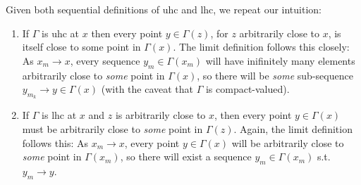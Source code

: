 \documentclass{article}
\theoremstyle{mythm}
\theoremstyle{mydef}
\begin{document}
Given both sequential definitions of uhc and lhc, we repeat our intuition:
\begin{enumerate}
  \item If $\Gamma$ is uhc at $x$ then every point $y \in \Gamma(z)$, for $z$ arbitrarily close to $x$, is itself close to some point in $\Gamma(x)$.  The limit definition follows this closely: As $x_m \to x$, every sequence $y_m \in \Gamma(x_m)$ will have inifinitely many elements arbitrarily close to \textit{some} point in $\Gamma(x)$, so there will be \textit{some} sub-sequence $y_{m_k} \to y \in \Gamma(x)$ (with the caveat that $\Gamma$ is compact-valued).

  \item If $\Gamma$ is lhc at $x$ and $z$ is arbitrarily close to $x$, then every point $y \in \Gamma(x)$ must be arbitrarily close to \textit{some} point in $\Gamma(z)$.  Again, the limit definition follows this: As $x_m \to x$, every point $y \in \Gamma(x)$ will be arbitrarily close to \textit{some} point in $\Gamma(x_m)$, so there will exist a sequence $y_m \in \Gamma(x_m)$ s.t. $y_m \to y$.
\end{enumerate}
\end{document}

